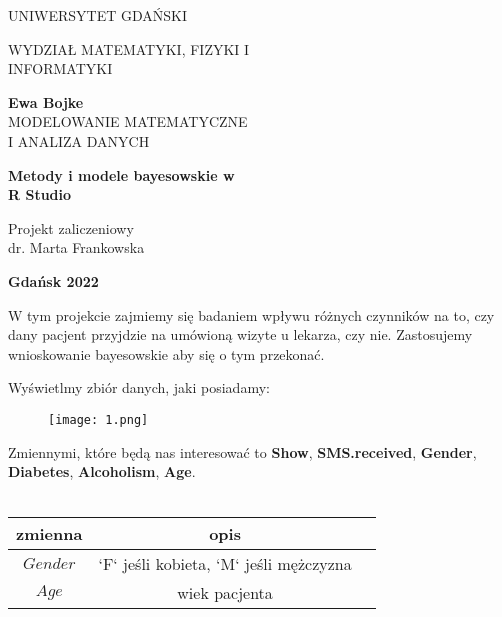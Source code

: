 \documentclass[12pt]{article}
\begin{document}
 \begin{center}
\LARGE{UNIWERSYTET GDAŃSKI}
\end{center}

\begin{center}
\LARGE{WYDZIAŁ MATEMATYKI, FIZYKI I\\ INFORMATYKI}
\end{center}


\vspace{50mm}
\begin{center}
\Large{\textbf{Ewa Bojke}}\\ \vskip 4mm
\large{MODELOWANIE MATEMATYCZNE \\I ANALIZA DANYCH}
\vspace{10mm}



\Huge\textbf{Metody i modele bayesowskie w \\ R Studio} 
\end{center}

\vspace{30mm}

\begin{flushright}
Projekt zaliczeniowy\\ 
dr. Marta Frankowska 
\end{flushright}
\vspace{20mm}
\begin{center}
\textbf{Gdańsk 2022}
\end{center}

\newpage

W tym projekcie zajmiemy się badaniem wpływu różnych czynników na to, czy dany pacjent przyjdzie na umówioną wizyte u lekarza, czy nie. Zastosujemy wnioskowanie bayesowskie aby się o tym przekonać.

Wyświetlmy zbiór danych, jaki posiadamy:

\begin{flushright}
\begin{figure}[ht!]
\texttt{[image: 1.png]}
\label{fig:2}
\end{figure}
\end{flushright}

Zmiennymi, które będą nas interesować to {\textbf{Show}}, {\textbf{SMS.received}}, {\textbf{Gender}}, {\textbf{Diabetes}}, {\textbf{Alcoholism}}, {\textbf{Age}}.
\\
\\
\begin{center}
	\begin{tabular}{ |c|c|c| } 
		\hline
		zmienna & opis   \\
		\hline
		$Gender$ & `F` jeśli kobieta, `M` jeśli mężczyzna  \\ 
		$Age$ & wiek pacjenta  \\
		\hline
	\end{tabular}
\end{center}
\end{document}
